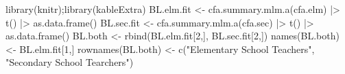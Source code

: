 \documentclass[
]{article}
\newenvironment{Shaded}{\begin{snugshade}}{\end{snugshade}}
\newcommand{\DecValTok}[1]{\textcolor[rgb]{0.00,0.00,0.81}{#1}}
\newcommand{\FunctionTok}[1]{\textcolor[rgb]{0.00,0.00,0.00}{#1}}
\newcommand{\NormalTok}[1]{#1}
\newcommand{\OtherTok}[1]{\textcolor[rgb]{0.56,0.35,0.01}{#1}}
\newcommand{\SpecialCharTok}[1]{\textcolor[rgb]{0.00,0.00,0.00}{#1}}
\newcommand{\StringTok}[1]{\textcolor[rgb]{0.31,0.60,0.02}{#1}}
\begin{document}
\begin{Shaded}
\begin{Highlighting}[]
\FunctionTok{library}\NormalTok{(knitr);}\FunctionTok{library}\NormalTok{(kableExtra)}
\NormalTok{BL.elm.fit }\OtherTok{\textless{}{-}} \FunctionTok{cfa.summary.mlm.a}\NormalTok{(cfa.elm) }\SpecialCharTok{|\textgreater{}} \FunctionTok{t}\NormalTok{() }\SpecialCharTok{|\textgreater{}} \FunctionTok{as.data.frame}\NormalTok{()}
\NormalTok{BL.sec.fit }\OtherTok{\textless{}{-}} \FunctionTok{cfa.summary.mlm.a}\NormalTok{(cfa.sec) }\SpecialCharTok{|\textgreater{}} \FunctionTok{t}\NormalTok{() }\SpecialCharTok{|\textgreater{}} \FunctionTok{as.data.frame}\NormalTok{()}
\NormalTok{BL.both }\OtherTok{\textless{}{-}} \FunctionTok{rbind}\NormalTok{(BL.elm.fit[}\DecValTok{2}\NormalTok{,], BL.sec.fit[}\DecValTok{2}\NormalTok{,]) }
\FunctionTok{names}\NormalTok{(BL.both) }\OtherTok{\textless{}{-}}\NormalTok{ BL.elm.fit[}\DecValTok{1}\NormalTok{,]}
\FunctionTok{rownames}\NormalTok{(BL.both) }\OtherTok{\textless{}{-}} \FunctionTok{c}\NormalTok{(}\StringTok{"Elementary School Teachers"}\NormalTok{,}
                       \StringTok{"Secondary School Tearchers"}\NormalTok{)}


\end{Highlighting}
\end{Shaded}
\end{document}
